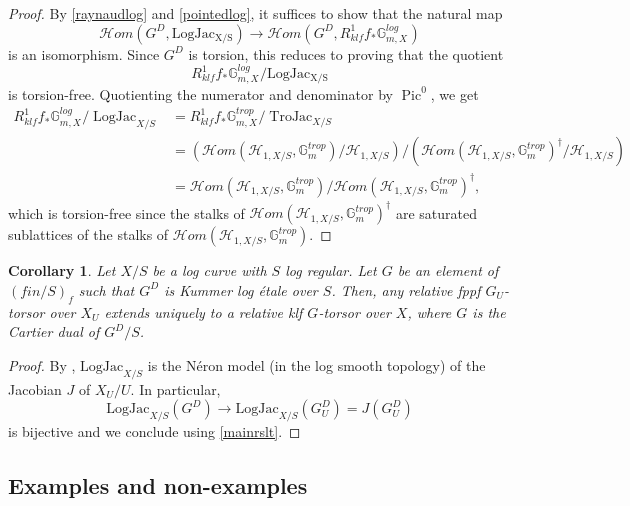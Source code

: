 \documentclass[a4paper,11pt]{amsart} %
\numberwithin{equation}{subsection}
\newcommand{\on}[1]{\operatorname{#1}}
\newcommand{\bb}[1]{{\mathbb{#1}}}
\newcommand{\ca}[1]{{\mathcal{#1}}}
\def\sheafhom{\mathcal{H}om}
\theoremstyle{definition}
\theoremstyle{plain}%
\newtheorem{corollary}[definition]{Corollary}
\theoremstyle{remark}
\begin{document}
\begin{proof} 
    By \ref{raynaudlog} and \ref{pointedlog}, it suffices to show that the natural map
    \[
    \sheafhom(G^D, \operatorname{LogJac_{X/S}}) \to \sheafhom(G^D, R^1_{klf}f_*\mathbb{G}_{m,X_{}}^{log})
    \]
    is an isomorphism. Since $G^D$ is torsion, this reduces to proving that the quotient $$R^1_{klf}f_*\mathbb{G}_{m,X_{}}^{log}/\operatorname{LogJac_{X/S}}$$ is torsion-free. Quotienting the numerator and denominator by $\on{Pic}^0$, we get
    \begin{align*}
        R^1_{klf}f_*\mathbb{G}_{m,X_{}}^{log} / \operatorname{LogJac}_{X/S} 
        & =R^1_{klf}f_*\mathbb{G}_{m,X_{}}^{trop}/\operatorname{TroJac}_{X/S} \\
        & = \left(\sheafhom(\ca H_{1,X/S},\bb G_m^{trop})/\ca H_{1,X/S}\right)/\left(\sheafhom(\ca H_{1,X/S},\bb G_m^{trop})^\dagger/\ca H_{1,X/S}\right) \\
        & = \sheafhom(\ca H_{1,X/S},\bb G_m^{trop})/\sheafhom(\ca H_{1,X/S},\bb G_m^{trop})^\dagger,
    \end{align*}
    which is torsion-free since the stalks of $\sheafhom(\ca H_{1,X/S},\bb G_m^{trop})^\dagger$ are saturated sublattices of the stalks of $\sheafhom(\ca H_{1,X/S},\bb G_m^{trop})$.
\end{proof}



\begin{corollary}\label{maincor}
    Let $X/S$ be a log curve with $S$ log regular. Let $G$ be an element of $(fin/S)_f$ such that $G^D$ is Kummer log \'etale over $S$. Then, any relative fppf $G_U$-torsor over $X_U$ extends uniquely to a relative klf $G$-torsor over $X$, where $G$ is the Cartier dual of $G^{D}/S$.
\end{corollary}

\begin{proof}
By \cite[Theorem 6.11]{HMOP}, $\mathrm{LogJac}_{X/S}$ is the Néron model (in the log smooth topology) of the Jacobian $J$ of $X_U/U$. In particular, $$\mathrm{LogJac}_{X/S}(G^D) \to \mathrm{LogJac}_{X/S}(G_U^D)=J(G_U^D)$$ is bijective and we conclude using \ref{mainrslt}.
\end{proof}


\subsection{Examples and non-examples}\label{section:examples}
\end{document}

